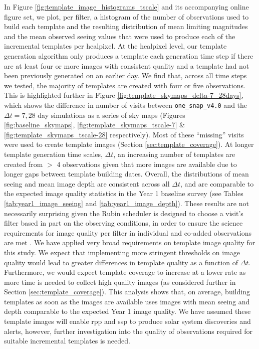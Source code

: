 \documentclass[preprintm,linenumbers]{aastex631}
\newcommand{\baseline}{\texttt{one\_snap\_v4.0}\xspace}
\begin{document}
		In Figure \ref{fig:template_image_histograms_tscale} and its accompanying online figure set, we plot, per filter, a histogram of the number of observations used to build each template and the resulting distribution of mean limiting magnitudes and the mean observed seeing values that were used to produce each of the incremental templates per healpixel. 
  At the healpixel level, our template generation algorithm only produces a template each generation time step if there are at least four or more images with consistent quality and a template had not been previously generated on an earlier day. 
  We find that, across all time steps we tested, the majority of templates are created with four or five observations. 
  This is highlighted further in Figure \ref{fig:template_skymaps_delta-7_28days}, which shows the difference in number of visits between \baseline and the $\Delta t = 7, 28$ day simulations as a series of sky maps (Figures \ref{fig:baseline_skymaps}, \ref{fig:template_skymaps_tscale-7} \& \ref{fig:template_skymaps_tscale-28} respectively).
  Most of these ``missing'' visits were used to create template images (Section \ref{sec:template_coverage}).
  At longer template generation time scales, $\Delta t$, an increasing number of templates are created from  $>$ 4 observations given that more images are available due to longer gaps between template building dates. 
  Overall, the distributions of mean seeing and mean image depth are consistent across all $\Delta t$, and are comparable to the expected image quality statistics in the Year 1 baseline survey (see Tables \ref{tab:year1_image_seeing} and \ref{tab:year1_image_depth}). 
  These results are not necessarily surprising given the Rubin scheduler is designed to choose a visit's filter based in part on the observing conditions, in order to ensure the science requirements for image quality per filter in individual and co-added observations are met \citep{lsstSRD}. 
  We have applied very broad requirements on template image quality for this study. 
  We expect that implementing more stringent thresholds on image quality would lead to greater differences in template quality as a function of $\Delta t$.
  Furthermore, we would expect template coverage to increase at a lower rate as more time is needed to collect high quality images (as considered further in Section \ref{sec:template_coverage}).
This analysis shows that, on average, building templates as soon as the images are available uses images with mean seeing and depth comparable to the  expected Year 1 image quality.
We have assumed these template images will enable \gls*{rpp} and \gls*{ssp} to produce solar system discoveries and alerts, however, further investigation into the quality of observations required for suitable incremental templates is needed. 
\end{document}
